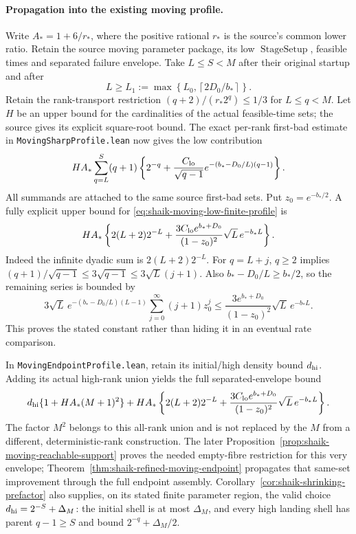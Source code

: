 \documentclass[11pt]{article}
\theoremstyle{remark}\newtheorem{remark}[proposition]{Remark}
\begin{document}
\paragraph{Propagation into the existing moving profile.}
Write \(A_*=1+6/r_*\), where the positive rational \(r_*\) is the
source's common lower ratio. Retain the source moving parameter
package, its low \(\operatorname{StageSetup}\), feasible times and
separated failure envelope. Take \(L\le S<M\) after their original
startup and after
\[
 L\ge L_1:=\max\left\{L_0,\left\lceil 2D_0/b_*\right\rceil\right\}.
\]
Retain the rank-transport restriction
\((q+2)/(r_*2^q)\le1/3\) for \(L\le q<M\).
Let \(H\) be an upper bound for the cardinalities of the actual
feasible-time sets; the source gives its explicit square-root bound.
The exact per-rank first-bad estimate in
\texttt{MovingSharpProfile.lean} now gives the low contribution
\begin{equation}\label{eq:shaik-moving-low-finite-profile}
 H A_*\sum_{q=L}^S(q+1)
 \left\{2^{-q}+\frac{C_{\rm lo}}{\sqrt{q-1}}
                 e^{-(b_*-D_0/L)(q-1)}\right\}.
\end{equation}
All summands are attached to the same source first-bad sets.
Put \(z_0=e^{-b_*/2}\). A fully explicit upper bound for
\eqref{eq:shaik-moving-low-finite-profile} is
\begin{equation}\label{eq:shaik-moving-low-explicit-profile}
 H A_*\left\{
  2(L+2)2^{-L}
  +\frac{3C_{\rm lo}e^{b_*+D_0}}{(1-z_0)^2}
                          \sqrt L\,e^{-b_*L}\right\}.
\end{equation}
Indeed the infinite dyadic sum is \(2(L+2)2^{-L}\).
For \(q=L+j\), \(q\ge2\) implies
\((q+1)/\sqrt{q-1}\le3\sqrt{q-1}\le3\sqrt L(j+1)\).
Also \(b_*-D_0/L\ge b_*/2\), so the remaining series is bounded by
\[
 3\sqrt L\,e^{-(b_*-D_0/L)(L-1)}
       \sum_{j=0}^{\infty}(j+1)z_0^j
 \le \frac{3e^{b_*+D_0}}{(1-z_0)^2}\sqrt L\,e^{-b_*L}.
\]
This proves the stated constant rather than hiding it in an eventual
rate comparison.

In \texttt{MovingEndpointProfile.lean}, retain its initial/high
density bound \(d_{\rm hi}\). Adding its actual high-rank union yields
the full separated-envelope bound
\[
 d_{\rm hi}\{1+H A_*(M+1)^2\}
 +H A_*\left\{2(L+2)2^{-L}
  +\frac{3C_{\rm lo}e^{b_*+D_0}}{(1-z_0)^2}
                         \sqrt L\,e^{-b_*L}\right\}.
\]
The factor \(M^2\) belongs to this all-rank union and is not replaced
by the \(M\) from a different, deterministic-rank construction.
The later Proposition~\ref{prop:shaik-moving-reachable-support} proves
the needed empty-fibre restriction for this very envelope;
Theorem~\ref{thm:shaik-refined-moving-endpoint} propagates that
same-set improvement through the full endpoint assembly.
Corollary~\ref{cor:shaik-shrinking-prefactor} also supplies, on its
stated finite parameter region, the valid choice
\(d_{\rm hi}=2^{-S}+\Delta_M\): the initial shell is at most
\(\Delta_M\), and every high landing shell has parent \(q-1\ge S\)
and bound \(2^{-q}+\Delta_M/2\).
\end{document}
